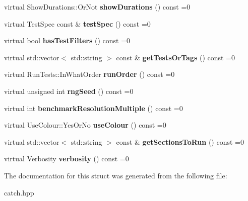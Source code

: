 \begin{DoxyCompactItemize}
virtual Show\+Durations\+::\+Or\+Not {\bfseries show\+Durations} () const =0
\item 
\mbox{\label{structCatch_1_1IConfig_a03a2fd8221d896d12bf3684ab2a03588}} 
virtual Test\+Spec const  \& {\bfseries test\+Spec} () const =0
\item 
\mbox{\label{structCatch_1_1IConfig_a49a475bbeb3180c06799d6d958914649}} 
virtual bool {\bfseries has\+Test\+Filters} () const =0
\item 
\mbox{\label{structCatch_1_1IConfig_a1b8a299344a493eb98c12faae48421d7}} 
virtual std\+::vector$<$ std\+::string $>$ const  \& {\bfseries get\+Tests\+Or\+Tags} () const =0
\item 
\mbox{\label{structCatch_1_1IConfig_a0fc59c9aba1d4018538d5526daa5eb78}} 
virtual Run\+Tests\+::\+In\+What\+Order {\bfseries run\+Order} () const =0
\item 
\mbox{\label{structCatch_1_1IConfig_ae049eb45979d841073fa65d1094c7f14}} 
virtual unsigned int {\bfseries rng\+Seed} () const =0
\item 
\mbox{\label{structCatch_1_1IConfig_a775f740b8af9df931e87db51dfdc6033}} 
virtual int {\bfseries benchmark\+Resolution\+Multiple} () const =0
\item 
\mbox{\label{structCatch_1_1IConfig_a87ec19a6b486eb5b5015cf7738fee026}} 
virtual Use\+Colour\+::\+Yes\+Or\+No {\bfseries use\+Colour} () const =0
\item 
\mbox{\label{structCatch_1_1IConfig_afc801995e115557f90e41f3d6e96908d}} 
virtual std\+::vector$<$ std\+::string $>$ const  \& {\bfseries get\+Sections\+To\+Run} () const =0
\item 
\mbox{\label{structCatch_1_1IConfig_a55aff5924bdbb3f558775821b1eb4b3d}} 
virtual Verbosity {\bfseries verbosity} () const =0
\end{DoxyCompactItemize}


The documentation for this struct was generated from the following file\+:\begin{DoxyCompactItemize}
\item 
catch.\+hpp\end{DoxyCompactItemize}
